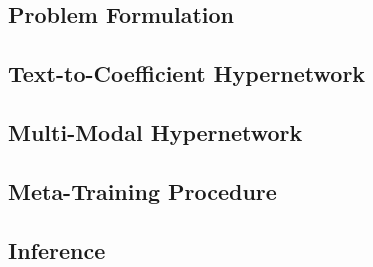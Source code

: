 \documentclass{article}
\begin{document}
\subsection{Problem Formulation}

\subsection{Text-to-Coefficient Hypernetwork}

\subsection{Multi-Modal Hypernetwork}

\subsection{Meta-Training Procedure}

\subsection{Inference}

\end{document}

